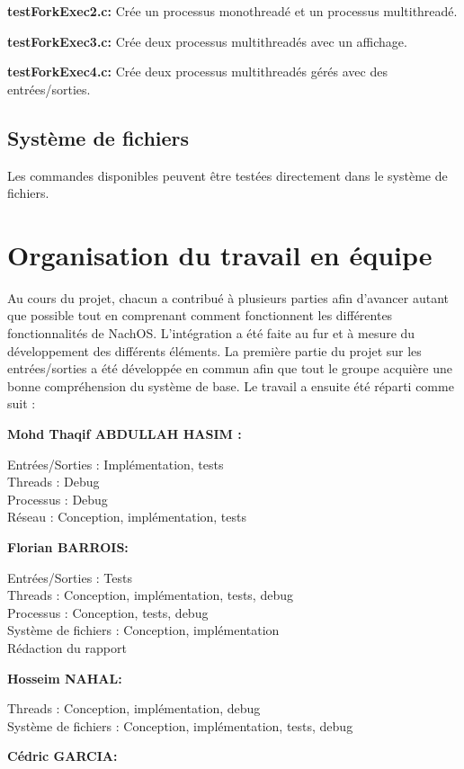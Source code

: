 \documentclass[12pt]{report}
\begin{document}
\textbf{testForkExec2.c:} Crée un processus monothreadé et un processus multithreadé.
\bigskip

\textbf{testForkExec3.c:} Crée deux processus multithreadés avec un affichage.
\bigskip

\textbf{testForkExec4.c:} Crée deux processus multithreadés gérés avec des entrées/sorties.
\bigskip

\section{Système de fichiers}

Les commandes disponibles peuvent être testées directement dans le système de fichiers.


\chapter{Organisation du travail en équipe}
Au cours du projet, chacun a contribué à plusieurs parties afin d'avancer autant que possible tout en comprenant
comment fonctionnent les différentes fonctionnalités de NachOS. L'intégration a été faite au fur et à mesure du développement des différents éléments. La première partie du projet sur les entrées/sorties a été développée en commun afin que tout le groupe acquière une bonne compréhension du système de base. Le travail a ensuite été réparti comme suit :
\bigskip


\textbf{Mohd Thaqif ABDULLAH HASIM :}

Entrées/Sorties : Implémentation, tests\\
Threads : Debug\\
Processus : Debug\\
Réseau : Conception, implémentation, tests
\bigskip 
 
\textbf{Florian BARROIS:}

Entrées/Sorties : Tests\\
Threads : Conception, implémentation, tests, debug\\
Processus : Conception, tests, debug\\
Système de fichiers : Conception, implémentation\\
Rédaction du rapport
\bigskip 

\textbf{Hosseim NAHAL:}

Threads : Conception, implémentation, debug\\
Système de fichiers : Conception, implémentation, tests, debug
\bigskip

\textbf{Cédric GARCIA:}
\end{document}
